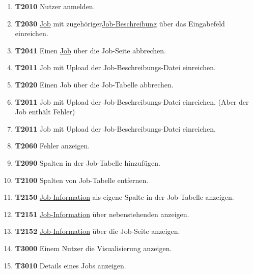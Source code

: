 \begin{enumerate}

    \item \textbf{T2010} \gls{Nutzer} anmelden.
        
    \item \textbf{T2030} \hyperref[B:Jobs]{Job} mit zugehöriger\hyperref[B:Job-Beschreibung]{Job-Beschreibung} über das Eingabefeld einreichen.
    
    \item \textbf{T2041} Einen \hyperref[B:Jobs]{Job} über die Job-Seite abbrechen.
    
    \item \textbf{T2011} Job mit Upload der Job-Beschreibungs-Datei einreichen. 
    
    \item \textbf{T2020} Einen Job über die Job-Tabelle abbrechen. 
    
    \item \textbf{T2011} Job mit Upload der Job-Beschreibungs-Datei einreichen. (Aber der Job enthält Fehler)
    
    \item \textbf{T2011} Job mit Upload der Job-Beschreibungs-Datei einreichen.
    
    \item \textbf{T2060} Fehler anzeigen.

    \item \textbf{T2090} Spalten in der Job-Tabelle hinzufügen.
    
    \item \textbf{T2100} Spalten von Job-Tabelle entfernen.
    
    \item \textbf{T2150} \hyperref[B:Job-Informationen]{Job-Information} als eigene Spalte in der Job-Tabelle anzeigen.
        
    \item \textbf{T2151} \hyperref[B:Job-Informationen]{Job-Information} über nebenstehenden anzeigen.
         
    \item \textbf{T2152} \hyperref[B:Job-Informationen]{Job-Information} über die Job-Seite anzeigen. 
    
    \item \textbf{T3000} Einem \gls{Nutzer} die Visualisierung anzeigen. 
    
    \item \textbf{T3010} Details eines Jobs anzeigen.
    

\end{enumerate}
